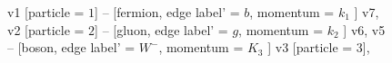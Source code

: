 \documentclass{revtex4}
\begin{document}
\begin{figure}[!htb]
\begin{center}
{    %
v1 [particle = \(1\)] -- [fermion, edge label' = \(b\), momentum = \(k_{1}\) ] v7, 
v2 [particle = \(2\)] -- [gluon, edge label' = \(g\), momentum = \(k_{2}\) ] v6, 
v5 -- [boson, edge label' = \(W^{-}\), momentum = \(K_{3}\) ] v3 [particle = \(3\)], 
}
\end{center}
\end{figure}
\end{document}
